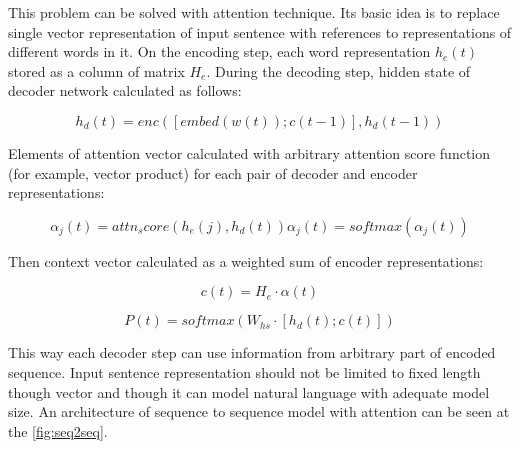 This problem can be solved with attention technique. Its basic idea is to replace single vector representation of input sentence with references to representations of different words in it. On the encoding step, each word representation $h_e(t)$ stored as a column of matrix $H_e$. During the decoding step, hidden state of decoder network calculated as follows:

\begin{equation}
h_d(t) = enc([embed(w(t));c(t-1)], h_d(t-1))
\label{attn:hd}
\end{equation} 

Elements of attention vector calculated with arbitrary attention score function (for example, vector product) for each pair of decoder and encoder representations:

\begin{equation}
\alpha_j(t) = attn_score(h_e(j), h_d(t))
\alpha_j(t) = softmax(\alpha_j(t))
\label{attn:alpha}
\end{equation}

Then context vector calculated as a weighted sum of encoder representations:

\begin{equation}
c(t) = H_e\cdot\alpha(t)
\label{attn:c}
\end{equation}

\begin{equation}
P(t) = softmax(W_{hs}\cdot[h_d(t);c(t)])
\label{attn:P}
\end{equation}

This way each decoder step can use information from arbitrary part of encoded sequence. Input sentence representation should not be limited to fixed length though vector and though it can model natural language with adequate model size. An architecture of sequence to sequence model with attention can be seen at the \ref{fig:seq2seq}.

